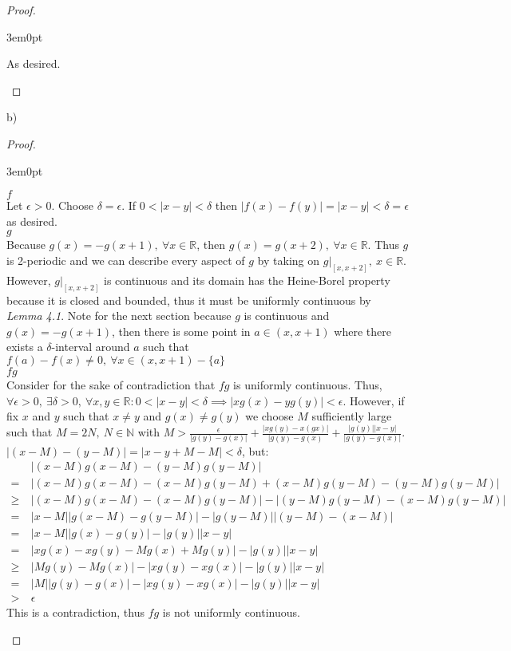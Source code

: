 \documentclass[11pt]{article}
\newcommand{\R}{\mathbb{R}}
\newcommand{\N}{\mathbb{N}}
\newenvironment{myproof}
{\begin{proof} \begin{adjustwidth}{3em}{0pt}$ $\par\nobreak\ignorespaces}
{\end{adjustwidth} \end{proof}}
\begin{document}
\begin{flushleft}
\begin{myproof}
As desired.

\end{myproof}

b)

\begin{myproof}

$f$ \\
Let $\epsilon > 0$. Choose $\delta = \epsilon$. If $0<|x-y|<\delta$ then $|f(x)-f(y)| = |x-y| < \delta = \epsilon$ as desired. \\
\bigskip
$g$ \\
Because $g(x) = -g(x+1), \ \forall x \in \R$, then $g(x) = g(x+2), \ \forall x \in \R$. Thus $g$ is 2-periodic and we can describe every aspect of $g$ by taking on $g|_{[x,x+2]}, \ x \in \R$. However, $g|_{[x,x+2]}$ is continuous and its domain has the Heine-Borel property because it is closed and bounded, thus it must be uniformly continuous by \textit{Lemma 4.1}. Note for the next section because $g$ is continuous and $g(x) = -g(x+1)$, then there is some point in $a \in (x,x+1)$ where there exists a $\delta$-interval around $a$ such that $f(a) - f(x) \neq 0, \ \forall x \in (x,x+1) - \{a\}$ \\
\bigskip
$fg$ \\
Consider for the sake of contradiction that $fg$ is uniformly continuous. Thus, $\forall \epsilon >0, \ \exists \delta > 0, \ \forall x,y \in \R: 0<|x-y|<\delta \implies |xg(x)-yg(y)| < \epsilon$. However, if fix $x$ and $y$ such that $x \neq y$ and $g(x) \neq g(y)$ we choose $M$ sufficiently large such that $M = 2N, \ N \in \N$ with $M > \frac{\epsilon}{|g(y)-g(x)|} + \frac{|xg(y)-x(gx)|}{|g(y)-g(x)} + \frac{|g(y)||x-y|}{|g(y)-g(x)|}$. $|(x-M)-(y-M)| = |x-y+M-M| < \delta$, but:
\begin{align*}
& \ |(x-M)g(x-M)-(y-M)g(y-M)|  \\
= & \ |(x-M)g(x-M) - (x-M)g(y-M) + (x-M)g(y-M) - (y-M)g(y-M)| \\
\geq & \ |(x-M)g(x-M) - (x-M)g(y-M)| - |(y-M)g(y-M) - (x-M)g(y-M)| \\
= & \ |x-M||g(x-M) - g(y-M)| - |g(y-M)||(y-M) - (x-M)| \\
= & \ |x-M||g(x) - g(y)| - |g(y)||x-y| \\
= & \ |xg(x) - xg(y) - Mg(x) + Mg(y)| - |g(y)||x-y| \\
\geq & \ |Mg(y)-Mg(x)| - |xg(y) - xg(x)| - |g(y)||x-y| \\
= & \ |M||g(y)-g(x)| - |xg(y) - xg(x)| - |g(y)||x-y| \\
> & \ \epsilon
\end{align*}
This is a contradiction, thus $fg$ is not uniformly continuous.


\end{myproof}
\end{flushleft}
\end{document}
